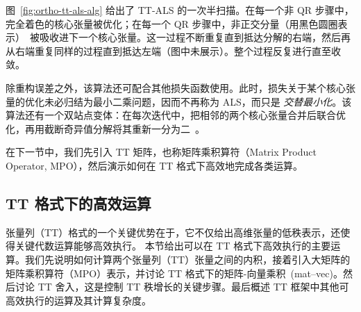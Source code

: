 图~\ref{fig:ortho-tt-als-alg} 给出了 TT-ALS 的一次半扫描。在每一个非 QR 步骤中，完全着色的核心张量被优化；在每一个 QR 步骤中，非正交分量（用黑色圆圈表示）~被吸收进下一个核心张量。这一过程不断重复直到抵达分解的右端，然后再从右端重复同样的过程直到抵达左端（图中未展示）。整个过程反复进行直至收敛。 
\begin{remark}
    除重构误差之外，该算法还可配合其他损失函数使用。此时，损失关于某个核心张量的优化未必归结为最小二乘问题，因而不再称为 ALS，而只是 \emph{交替最小化}。该算法还有一个双站点变体：在每次迭代中，把相邻的两个核心张量合并后联合优化，再用截断奇异值分解将其重新一分为二~\citep{holtz2012alternating}。
\end{remark}

在下一节中，我们先引入 TT 矩阵，也称矩阵乘积算符（Matrix Product Operator, MPO），然后演示如何在 TT 格式下高效地完成各类运算。
\subsection{TT 格式下的高效运算}\label{sec:efficient-operations}
张量列（TT）格式的一个关键优势在于，它不仅给出高维张量的低秩表示，还使得关键代数运算能够高效执行。
本节给出可以在 TT 格式下高效执行的主要运算。我们先说明如何计算两个张量列（TT）张量之间的内积，接着引入大矩阵的矩阵乘积算符（MPO）表示，并讨论 TT 格式下的矩阵-向量乘积~(mat–vec)。然后讨论 TT 舍入，这是控制 TT 秩增长的关键步骤。最后概述 TT 框架中其他可高效执行的运算及其计算复杂度。
